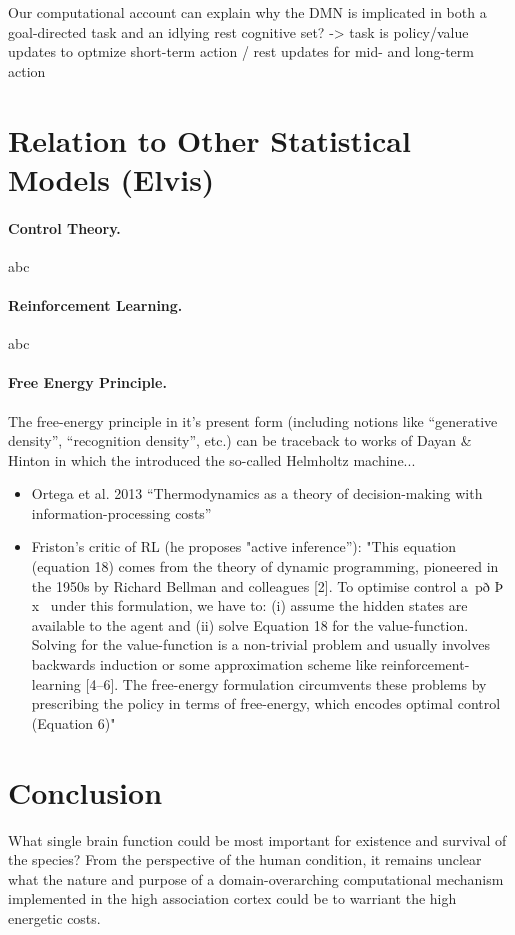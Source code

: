 \documentclass{article} %
\begin{document}
Our computational account can explain why the DMN is implicated in both a goal-directed task and an idlying rest cognitive set? -> task is policy/value updates to optmize short-term action / rest updates for mid- and long-term action


\section{Relation to Other Statistical Models (Elvis)}
\paragraph{Control Theory.}
abc

\paragraph{Reinforcement Learning.}
abc

\paragraph{Free Energy Principle.}
The free-energy principle in it's present form (including notions like ``generative density'', ``recognition density'', etc.) can be traceback to works of Dayan \& Hinton \cite{dayan1995helmholtz} in which the introduced the so-called Helmholtz machine...

\begin{itemize}
  \item Ortega et al. 2013 \cite{ortega2013thermodynamics} ``Thermodynamics as a theory of decision-making with information-processing costs''
\item Friston's critic of RL \cite{fristonAIorRL} (he proposes "active inference''): "This equation (equation 18) comes from the theory of dynamic programming,
pioneered in the 1950s by Richard Bellman and colleagues [2]. To
optimise control a~pð Þ x~ under this formulation, we have to: (i)
assume the hidden states are available to the agent and (ii) solve
Equation 18 for the value-function. Solving for the value-function
is a non-trivial problem and usually involves backwards induction
or some approximation scheme like reinforcement-learning [4–6].
The free-energy formulation circumvents these problems by
prescribing the policy in terms of free-energy, which encodes
optimal control (Equation 6)"
  \end{itemize}

\section{Conclusion}
What single brain function could be most important for existence and survival of the species?
From the perspective of the human condition, it remains unclear what the nature and purpose of a domain-overarching computational mechanism implemented in the high association cortex could be to warriant the high energetic costs.
\end{document}
